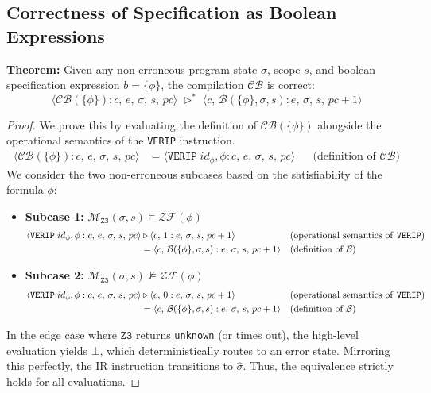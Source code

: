 \documentclass{article}
\begin{document}
\subsection{Correctness of Specification as Boolean Expressions}

\textbf{Theorem:} Given any non-erroneous program state $\sigma$, scope $s$, and boolean specification expression $b = \{ \phi \}$, the compilation $\mathcal{CB}$ is correct:
\[
\langle \mathcal{CB}(\{ \phi \}) : c,\, e,\, \sigma,\, s,\, pc \rangle \; \triangleright^{\ast} \;
\langle c,\, \mathcal{B}(\{ \phi \}, \sigma, s) : e,\, \sigma,\, s,\, pc + 1 \rangle
\]

\begin{proof}
We prove this by evaluating the definition of $\mathcal{CB}(\{ \phi \})$ alongside the operational semantics of the \texttt{VERIP} instruction.
\[
\begin{aligned}
\langle \mathcal{CB}(\{ \phi \}) : c,\, e,\, \sigma,\, s,\, pc \rangle 
&= \langle \mathtt{VERIP}\; id_\phi, \phi : c,\, e,\, \sigma,\, s,\, pc \rangle && \text{(definition of $\mathcal{CB}$)}
\end{aligned}
\]
We consider the two non-erroneous subcases based on the satisfiability of the formula $\phi$:
\begin{itemize}
    \item \textbf{Subcase 1: } $\mathcal{M}_{\mathtt{Z3}}(\sigma, s) \models \mathcal{ZF}(\phi)$
    \[
    \begin{aligned}
    \langle \mathtt{VERIP}\; id_\phi, \phi : c,\, e,\, \sigma,\, s,\, pc \rangle 
    &\triangleright \langle c,\, 1 : e,\, \sigma,\, s,\, pc + 1 \rangle && \text{(operational semantics of \texttt{VERIP})} \\
    &= \langle c,\, \mathcal{B}(\{ \phi \}, \sigma, s) : e,\, \sigma,\, s,\, pc + 1 \rangle && \text{(definition of $\mathcal{B}$)}
    \end{aligned}
    \]
    \item \textbf{Subcase 2: } $\mathcal{M}_{\mathtt{Z3}}(\sigma, s) \not\models \mathcal{ZF}(\phi)$
    \[
    \begin{aligned}
    \langle \mathtt{VERIP}\; id_\phi, \phi : c,\, e,\, \sigma,\, s,\, pc \rangle 
    &\triangleright \langle c,\, 0 : e,\, \sigma,\, s,\, pc + 1 \rangle && \text{(operational semantics of \texttt{VERIP})} \\
    &= \langle c,\, \mathcal{B}(\{ \phi \}, \sigma, s) : e,\, \sigma,\, s,\, pc + 1 \rangle && \text{(definition of $\mathcal{B}$)}
    \end{aligned}
    \]
\end{itemize}
In the edge case where $\mathtt{Z3}$ returns \texttt{unknown} (or times out), the high-level evaluation yields $\bot$, which deterministically routes to an error state. Mirroring this perfectly, the IR instruction transitions to $\hat{\sigma}$. Thus, the equivalence strictly holds for all evaluations.
\end{proof}
\end{document}
